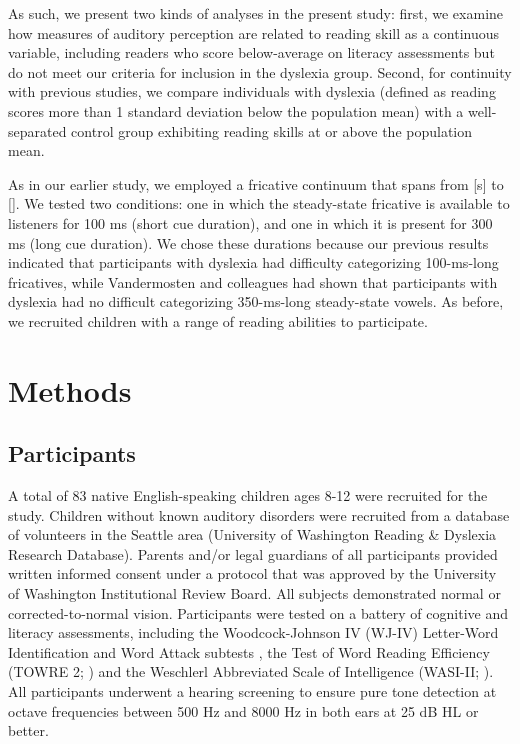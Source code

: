 \documentclass[../uwthesis.tex]{subfiles}
\begin{document}
As such, we present two kinds of analyses in the present study: first, we examine how measures of auditory perception are related to reading skill as a continuous variable, including readers who score below-average on literacy assessments but do not meet our criteria for inclusion in the dyslexia group. Second, for continuity with previous studies, we compare individuals with dyslexia (defined as reading scores more than 1 standard deviation below the population mean) with a well-separated control group exhibiting reading skills at or above the population mean.

As in our earlier study, we employed a fricative continuum that spans from [s] to []. We tested two conditions: one in which the steady-state fricative is available to listeners for 100 ms (short cue duration), and one in which it is present for 300 ms (long cue duration). We chose these durations because our previous results indicated that participants with dyslexia had difficulty categorizing 100-ms-long fricatives, while Vandermosten and colleagues had shown that participants with dyslexia had no difficult categorizing 350-ms-long steady-state vowels. As before, we recruited children with a range of reading abilities to participate.

\section{Methods}
\subsection{Participants}
A total of 83 native English-speaking children ages 8-12 were recruited for the study. Children without known auditory disorders were recruited from a database of volunteers in the Seattle area (University of Washington Reading \& Dyslexia Research Database). Parents and/or legal guardians of all participants provided written informed consent under a protocol that was approved by the University of Washington Institutional Review Board. All subjects demonstrated normal or corrected-to-normal vision. Participants were tested on a battery of cognitive and literacy assessments, including the Woodcock-Johnson IV (WJ-IV) Letter-Word Identification and Word Attack subtests \citep{Schrank2014Woodcock-JohnsonAchievement}, the Test of Word Reading Efficiency (TOWRE 2; \citep{Torgesen2011TOWREEfficiency}) and the Weschlerl Abbreviated Scale of Intelligence (WASI-II; \citep{Wechsler2011WechslerManual.}). All participants underwent a hearing screening to ensure pure tone detection at octave frequencies between 500 Hz and 8000 Hz in both ears at 25 dB HL or better.
\end{document}
